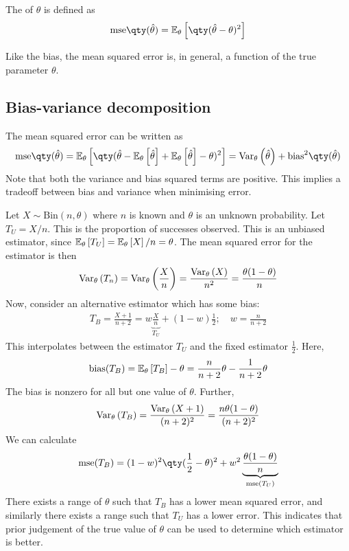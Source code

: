 \begin{definition}
	The  of $\theta$ is defined as
	\begin{align*}
		\mathrm{mse}\qty(\hat \theta) = \esub{\theta}{\qty(\hat \theta - \theta)^2}
	\end{align*}
\end{definition}

\begin{remark}
	Like the bias, the mean squared error is, in general, a function of the true parameter $\theta$.
\end{remark}

\subsection{Bias-variance decomposition}
The mean squared error can be written as
\begin{align*}
	\mathrm{mse}\qty(\hat \theta) = \esub{\theta}{\qty(\hat \theta - \esub{\theta}{\hat\theta} + \esub{\theta}{\hat\theta} - \theta)^2} = \Varsub{\theta}{\hat \theta} + \mathrm{bias}^2\qty(\hat\theta)
\end{align*}
Note that both the variance and bias squared terms are positive.
This implies a tradeoff between bias and variance when minimising error.
\begin{example}
	Let $X \sim \mathrm{Bin}(n, \theta)$ where $n$ is known and $\theta$ is an unknown probability.
	Let $T_U = X / n$.
	This is the proportion of successes observed.
	This is an unbiased estimator, since $\mathbb{E}_{\theta}\left[{T_U}\right] = \mathbb{E}_{\theta}\left[{X}\right]/n = \theta$.
	The mean squared error for the estimator is then
	\begin{align*}
		\operatorname{Var}_{\theta}\left({T_n}\right) = \operatorname{Var}_{\theta}\left({\frac{X}{n}}\right) = \frac{\operatorname{Var}_{\theta}\left({X}\right)}{n^2} = \frac{\theta(1-\theta)}{n}
	\end{align*}
	Now, consider an alternative estimator which has some bias:
	\begin{align*}
		T_B = \frac{X+1}{n+2} = w \underbrace{\frac{X}{n}}_{T_U} + (1-w)\frac{1}{2};\quad w = \frac{n}{n+2}
	\end{align*}
	This interpolates between the estimator $T_U$ and the fixed estimator $\frac{1}{2}$.
	Here,
	\begin{align*}
		\mathrm{bias}(T_B) = \mathbb{E}_{\theta}\left[{T_B}\right] - \theta = \frac{n}{n+2}\theta - \frac{1}{n+2}\theta
	\end{align*}
	The bias is nonzero for all but one value of $\theta$.
	Further,
	\begin{align*}
		\operatorname{Var}_{\theta}\left({T_B}\right) = \frac{\operatorname{Var}_{\theta}\left({X+1}\right)}{(n+2)^2} = \frac{n\theta(1-\theta)}{(n+2)^2}
	\end{align*}
	We can calculate
	\begin{align*}
		\mathrm{mse}(T_B) = (1-w)^2 \qty(\frac{1}{2} - \theta)^2 + w^2\underbrace{\frac{\theta(1-\theta)}{n}}_{\mathrm{mse}(T_U)}
	\end{align*}
	There exists a range of $\theta$ such that $T_B$ has a lower mean squared error, and similarly there exists a range such that $T_U$ has a lower error.
	This indicates that prior judgement of the true value of $\theta$ can be used to determine which estimator is better.
\end{example}
